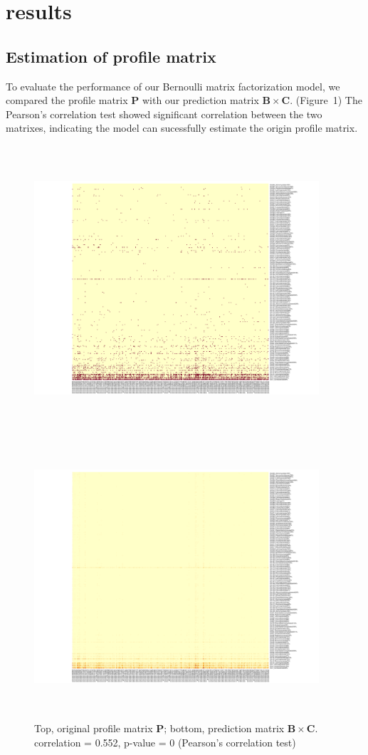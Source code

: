\documentclass{bioinfo}
\begin{document}
\section{results}

\subsection{Estimation of profile matrix}
To evaluate the performance of our Bernoulli matrix factorization model, we compared the profile matrix $\boldsymbol{P}$ with our prediction matrix $\boldsymbol{B}\times\boldsymbol{C}$. (Figure~1\vphantom{\ref{fig:01}}) The Pearson's correlation test showed significant correlation between the two matrixes, indicating the model can sucessfully estimate the origin profile matrix.

\begin{figure}[!tpb]%
	\centerline{\includegraphics[width=300pt,height=300pt,keepaspectratio]{fig_1_a.pdf}}
	\centerline{\includegraphics[width=300pt,height=300pt,keepaspectratio]{fig_1_b.pdf}}
	\caption{Top, original profile matrix $\boldsymbol{P}$; bottom, prediction matrix $\boldsymbol{B}\times\boldsymbol{C}$.
	correlation = 0.552, p-value = 0 (Pearson's correlation test)}\label{fig:01}
\end{figure}
\end{document}
